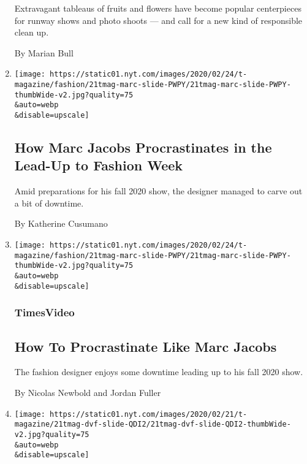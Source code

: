\begin{enumerate}
  Extravagant tableaus of fruits and flowers have become popular
  centerpieces for runway shows and photo shoots --- and call for a new
  kind of responsible clean up.

  By Marian Bull
\item
  \href{/2020/02/21/t-magazine/marc-jacobs-procrastination.html}{}

  \texttt{[image: https://static01.nyt.com/images/2020/02/24/t-magazine/fashion/21tmag-marc-slide-PWPY/21tmag-marc-slide-PWPY-thumbWide-v2.jpg?quality=75\\\&auto=webp\\\&disable=upscale]}

  \hypertarget{how-marc-jacobs-procrastinates-in-the-lead-up-to-fashion-week}{%
  \subsection{How Marc Jacobs Procrastinates in the Lead-Up to Fashion
  Week}\label{how-marc-jacobs-procrastinates-in-the-lead-up-to-fashion-week}}

  Amid preparations for his fall 2020 show, the designer managed to
  carve out a bit of downtime.

  By Katherine Cusumano
\item
  \href{/video/t-magazine/fashion/100000006992316/how-to-procrastinate-like-marc-jacobs.html}{}

  \texttt{[image: https://static01.nyt.com/images/2020/02/24/t-magazine/fashion/21tmag-marc-slide-PWPY/21tmag-marc-slide-PWPY-thumbWide-v2.jpg?quality=75\\\&auto=webp\\\&disable=upscale]}

  \hypertarget{timesvideo}{%
  \subsubsection{TimesVideo}\label{timesvideo}}

  \hypertarget{how-to--procrastinate-like-marc-jacobs}{%
  \subsection{How To \textbar{} Procrastinate Like Marc
  Jacobs}\label{how-to--procrastinate-like-marc-jacobs}}

  The fashion designer enjoys some downtime leading up to his fall 2020
  show.

  By Nicolas Newbold and Jordan Fuller
\item
  \href{/2020/02/21/t-magazine/diane-von-furstenberg-talismans.html}{}

  \texttt{[image: https://static01.nyt.com/images/2020/02/21/t-magazine/21tmag-dvf-slide-QDI2/21tmag-dvf-slide-QDI2-thumbWide-v2.jpg?quality=75\\\&auto=webp\\\&disable=upscale]}


\end{enumerate}
